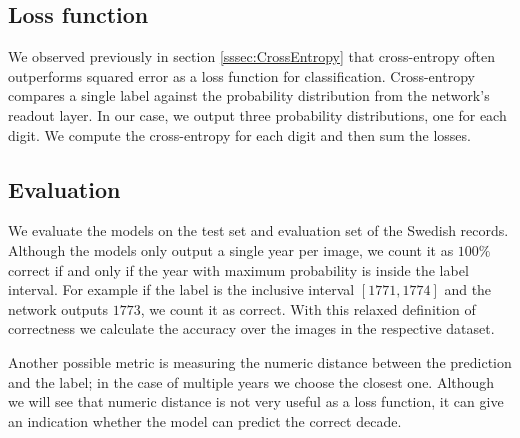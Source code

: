 


\subsection{Loss function}

We observed previously in section \ref{sssec:CrossEntropy} that cross-entropy often outperforms squared error as a loss function for classification. Cross-entropy compares a single label against the probability distribution from the network's readout layer. In our case, we output three probability distributions, one for each digit.
We compute
the cross-entropy for each digit and then sum the losses.

\subsection{Evaluation}

We evaluate the models on the test set and evaluation set of the Swedish records. Although the models only output a single year per image, we count it as $100\%$ correct if and only if the year with maximum probability is inside the label interval. For example if the label is the inclusive interval $[1771, 1774]$ and the network outputs $1773$, we count it as correct. With this relaxed definition of correctness we calculate the accuracy over the images in the respective dataset.

Another possible metric is measuring the numeric distance between the prediction and the label; in the case of multiple years we choose the closest one. Although we will see that numeric distance is not very useful as a loss function, it can give an indication whether the model can predict the correct decade.



